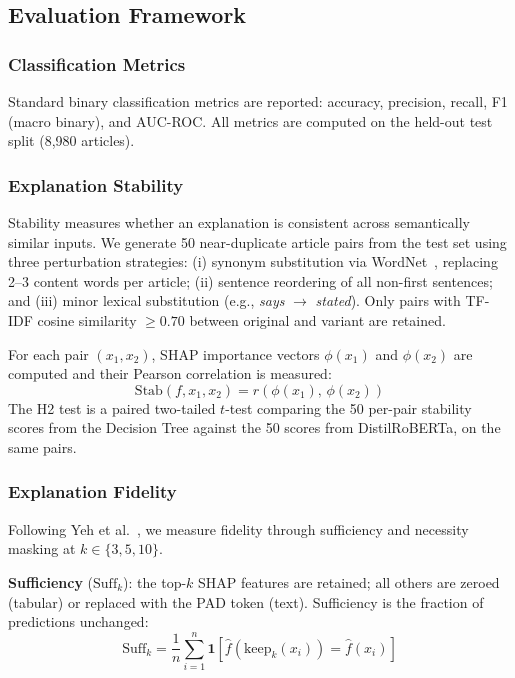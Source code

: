 \documentclass[journal,10pt,twocolumn]{IEEEtran}
\begin{document}
\subsection{Evaluation Framework}
\label{sec:eval}

\subsubsection{Classification Metrics}
Standard binary classification metrics are reported: accuracy,
precision, recall, F1 (macro binary), and AUC-ROC.  All metrics are
computed on the held-out test split (8{,}980 articles).

\subsubsection{Explanation Stability}
Stability measures whether an explanation is consistent across
semantically similar inputs.  We generate 50 near-duplicate article
pairs from the test set using three perturbation strategies: (i)
synonym substitution via WordNet~\cite{miller1995wordnet}, replacing
2--3 content words per article; (ii) sentence reordering of all
non-first sentences; and (iii) minor lexical substitution (e.g.,
\emph{says} $\to$ \emph{stated}).  Only pairs with TF-IDF cosine
similarity $\geq 0.70$ between original and variant are retained.

For each pair $(x_1, x_2)$, SHAP importance vectors $\phi(x_1)$ and
$\phi(x_2)$ are computed and their Pearson correlation is measured:
\begin{equation}
  \mathrm{Stab}(f, x_1, x_2)
    = r\!\left(\phi(x_1),\, \phi(x_2)\right)
  \label{eq:stability}
\end{equation}
The H2 test is a paired two-tailed $t$-test comparing the 50
per-pair stability scores from the Decision Tree against the 50
scores from DistilRoBERTa, on the same pairs.

\subsubsection{Explanation Fidelity}
Following Yeh et al.~\cite{yeh2019fidelity}, we measure fidelity through
sufficiency and necessity masking at $k \in \{3, 5, 10\}$.

\textbf{Sufficiency} ($\mathrm{Suff}_k$): the top-$k$ SHAP features
are retained; all others are zeroed (tabular) or replaced with the PAD
token (text).  Sufficiency is the fraction of predictions unchanged:
\begin{equation}
  \mathrm{Suff}_k
    = \frac{1}{n}\sum_{i=1}^{n}
      \mathbf{1}\!\left[\hat{f}\!\left(\mathrm{keep}_k(x_i)\right)
        = \hat{f}(x_i)\right]
  \label{eq:sufficiency}
\end{equation}
\end{document}
